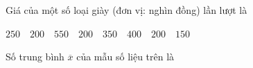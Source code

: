 \begin{ex}
Giá của một số loại giày (đơn vị: nghìn đồng) lần lượt là
\begin{center}
$250 \quad 200 \quad 550 \quad 200 \quad 350 \quad 400 \quad 200 \quad 150$
\end{center}
Số trung bình $\overline x$ của mẫu số liệu trên là
\end{ex}
